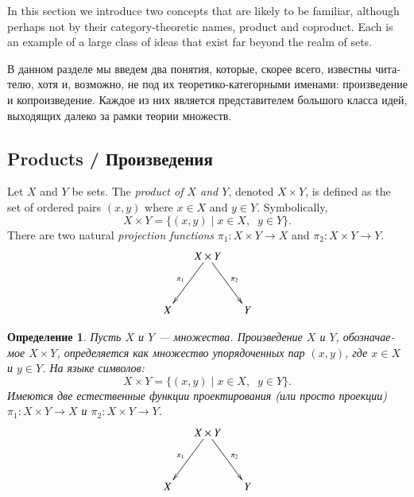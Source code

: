 \documentclass[a4paper]{book}
\def\to{\rightarrow}
\def\taking{\colon}
\def\|{{\;|\;}}
\theoremstyle{myth}
\newtheorem{definitionENG}[envENG]{\begin{english}Definition\end{english}}
\newtheorem{definitionRUS}[envRUS]{Определение}
\begin{document}
\begin{russian}
In this section we introduce two concepts that are likely to be familiar, although perhaps not by their category-theoretic names, product and coproduct. Each is an example of a large class of ideas that exist far beyond the realm of sets.

В данном разделе мы введем два понятия, которые, скорее всего, известны читателю, хотя и, возможно, не под их теоретико-категорными именами: произведение и копроизведение. Каждое из них является представителем большого класса идей, выходящих далеко за рамки теории множеств. 


\subsection{Products / Произведения}\label{sec:products}

\begin{definitionENG}
Let $X$ and $Y$ be sets. The {\em product of $X$ and $Y$}, denoted $X\times Y$, is defined as the set of ordered pairs $(x,y)$ where $x\in X$ and $y\in Y$. Symbolically, $$X\times Y=\{(x,y)\|x\in X,\;\; y\in Y\}.$$ There are two natural {\em projection functions} $\pi_1\taking X\times Y\to X$ and $\pi_2\taking X\times Y\to Y$.
$$\xymatrix@=15pt{&X\times Y\ar[ddr]^{\pi_2}\ar[ddl]_{\pi_1}\\\\X&&Y}$$
\end{definitionENG}

\begin{definitionRUS}
Пусть $X$ и $Y$ — множества. {\em Произведение $X$ и $Y$}, обозначаемое $X\times Y$, определяется как множество упорядоченных пар $(x,y)$, где $x\in X$ и $y\in Y$. На языке символов: $$X\times Y=\{(x,y)\|x\in X,\;\; y\in Y\}.$$ Имеются две естественные {\em функции проектирования} (или просто {\em проекции}) $\pi_1\taking X\times Y\to X$ и $\pi_2\taking X\times Y\to Y$.
$$\xymatrix@=15pt{&X\times Y\ar[ddr]^{\pi_2}\ar[ddl]_{\pi_1}\\\\X&&Y}$$
\end{definitionRUS}


\end{russian}
\end{document}

